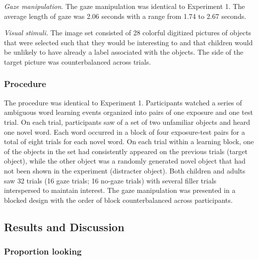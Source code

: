 \documentclass[10pt, letterpaper]{article}
\begin{document}
\emph{Gaze manipulation}. The gaze manipulation was identical to
Experiment 1. The average length of gaze was 2.06 seconds with a range
from 1.74 to 2.67 seconds.

\emph{Visual stimuli.} The image set consisted of 28 colorful digitized
pictures of objects that were selected such that they would be
interesting to and that children would be unlikely to have already a
label associated with the objects. The side of the target picture was
counterbalanced across trials.

\hypertarget{procedure-1}{%
\subsubsection{Procedure}\label{procedure-1}}

The procedure was identical to Experiment 1. Participants watched a
series of ambiguous word learning events organized into pairs of one
exposure and one test trial. On each trial, participants saw of a set of
two unfamiliar objects and heard one novel word. Each word occurred in a
block of four exposure-test pairs for a total of eight trials for each
novel word. On each trial within a learning block, one of the objects in
the set had consistently appeared on the previous trials (target
object), while the other object was a randomly generated novel object
that had not been shown in the experiment (distracter object). Both
children and adults saw 32 trials (16 gaze trials; 16 no-gaze trials)
with several filler trials interspersed to maintain interest. The gaze
manipulation was presented in a blocked design with the order of block
counterbalanced across participants.

\hypertarget{results-and-discussion-1}{%
\subsection{Results and Discussion}\label{results-and-discussion-1}}

\hypertarget{proportion-looking}{%
\subsubsection{Proportion looking}\label{proportion-looking}}
\end{document}
